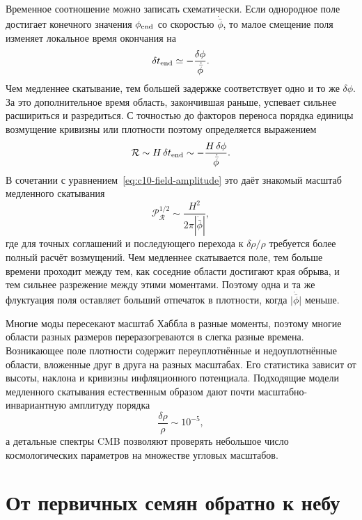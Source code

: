 Временное соотношение можно записать схематически. Если однородное поле достигает конечного значения \(\phi_{\rm end}\) со скоростью \(\dot{\bar\phi}\), то малое смещение поля изменяет локальное время окончания на
\begin{equation}
\delta t_{\rm end}
\simeq-\frac{\delta\phi}{\dot{\bar\phi}}.
\label{eq:c10-time-delay}
\end{equation}
Чем медленнее скатывание, тем большей задержке соответствует одно и то же \(\delta\phi\). За это дополнительное время область, закончившая раньше, успевает сильнее расшириться и разредиться. С точностью до факторов переноса порядка единицы возмущение кривизны или плотности поэтому определяется выражением
\begin{equation}
\mathcal R
\sim H\,\delta t_{\rm end}
\sim-\frac{H\,\delta\phi}{\dot{\bar\phi}}.
\label{eq:c10-curvature-estimate}
\end{equation}
В сочетании с уравнением~\eqref{eq:c10-field-amplitude} это даёт знакомый масштаб медленного скатывания
\begin{equation}
\mathcal P_{\mathcal R}^{1/2}
\sim\frac{H^2}{2\pi|\dot{\bar\phi}|},
\label{eq:c10-slow-roll-amplitude}
\end{equation}
где для точных соглашений и последующего перехода к \(\delta\rho/\rho\) требуется более полный расчёт возмущений. Чем медленнее скатывается поле, тем больше времени проходит между тем, как соседние области достигают края обрыва, и тем сильнее разрежение между этими моментами. Поэтому одна и та же флуктуация поля оставляет больший отпечаток в плотности, когда \(\lvert\dot{\bar\phi}\rvert\) меньше.

Многие моды пересекают масштаб Хаббла в разные моменты, поэтому многие области разных размеров переразогреваются в слегка разные времена. Возникающее поле плотности содержит переуплотнённые и недоуплотнённые области, вложенные друг в друга на разных масштабах. Его статистика зависит от высоты, наклона и кривизны инфляционного потенциала. Подходящие модели медленного скатывания естественным образом дают почти масштабно-инвариантную амплитуду порядка
\[
\frac{\delta\rho}{\rho}\sim10^{-5},
\]
а детальные спектры CMB позволяют проверять небольшое число космологических параметров на множестве угловых масштабов.

\section{От первичных семян обратно к небу}

